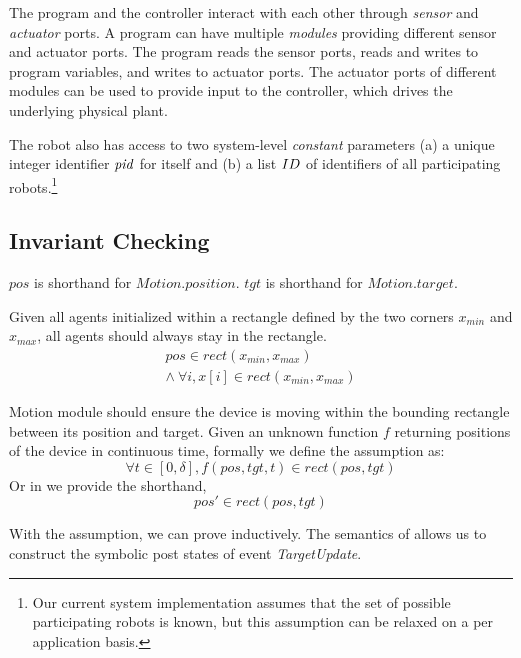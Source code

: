 The program and the controller interact with each other through \emph{sensor} and \emph{actuator} ports.
A \lgname program can have multiple \emph{modules} providing different sensor and actuator ports.
The program reads the sensor ports, reads and writes to program variables, and writes to actuator ports.
The actuator ports of different modules can be used to provide input to the controller, which drives the underlying physical plant.


The robot also has access to two system-level \emph{constant} parameters (a) a unique integer identifier $\mathit{pid}$ for itself and (b) a list $ID$ of identifiers of all participating robots.\footnote{Our current system implementation assumes that the set of possible participating robots is known, but this assumption can be relaxed on a per application basis.}


\subsection{Invariant Checking}

$pos$ is shorthand for $Motion.position$. $tgt$ is shorthand for $Motion.target$.

\begin{invariant}\label{inv:lineform}
Given all agents initialized within a rectangle defined by the two corners $x_{min}$ and $x_{max}$,
all agents should always stay in the rectangle.
\[
\begin{split}
    pos \in rect(x_{min}, x_{max})        \\
    \land\ \forall i, x[i] \in rect(x_{min}, x_{max})
\end{split}
\]
\end{invariant}


\begin{assumption}\label{lineform-assume}
Motion module should ensure the device is moving within the bounding rectangle between its position and target.
Given an unknown function $f$ returning positions of the device in continuous time,
formally we define the assumption as:
\[
\forall t \in [0, \delta], f(pos, tgt, t) \in rect(pos, tgt)
\]
Or in \lgname we provide the shorthand,
\[
pos' \in rect(pos, tgt)
\]
\end{assumption}

With the assumption, we can prove  inductively.
The \K semantics of \lgname allows us to construct the symbolic post states of event \emph{TargetUpdate}.


\begin{figure}
\end{figure}


